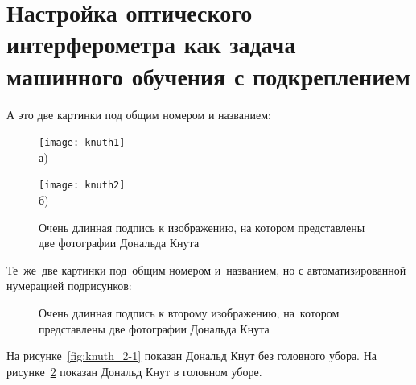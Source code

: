 \section{Настройка оптического интерферометра как задача машинного обучения с подкреплением}\label{sec:ch2/sect2}

А это две картинки под общим номером и названием:
\begin{figure}[ht]
    \begin{minipage}[b][][b]{0.49\linewidth}\centering
        \texttt{[image: knuth1]} \\ а)
    \end{minipage}
    \hfill
    \begin{minipage}[b][][b]{0.49\linewidth}\centering
        \texttt{[image: knuth2]} \\ б)
    \end{minipage}
    \caption{Очень длинная подпись к изображению,
        на котором представлены две фотографии Дональда Кнута}
    \label{fig:knuth}
\end{figure}

Те~же~две картинки под~общим номером и~названием,
но с автоматизированной нумерацией подрисунков:
\begin{figure}[ht]
    \caption[Этот текст попадает в названия рисунков в списке рисунков]{Очень
        длинная подпись к второму изображению, на~котором представлены две
        фотографии Дональда Кнута}\label{fig:knuth_2}
\end{figure}

На рисунке~\cref{fig:knuth_2-1} показан Дональд Кнут без головного убора.
На рисунке~\cref{fig:knuth_2}
показан Дональд Кнут в головном уборе.

